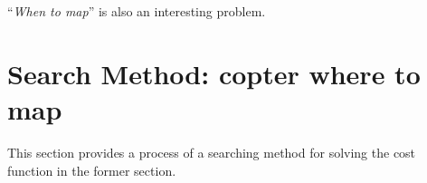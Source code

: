 \documentclass[conference]{IEEEtran}
\begin{document}
``{\it When to map}'' is also an interesting problem.

\section{Search Method: copter where to map}
This section provides a process of a searching method for solving the cost function in the former section.
\end{document}
